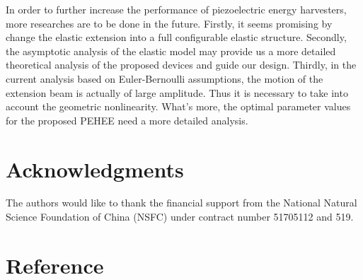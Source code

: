 \documentclass{elsarticle}
\begin{document}
In order to further increase the performance of piezoelectric energy harvesters, more researches are to be done in the future. Firstly, it seems promising by change the elastic extension into a full configurable elastic structure. Secondly, the asymptotic analysis of the elastic model may provide us a more detailed theoretical analysis of the proposed devices and guide our design. Thirdly, in the current analysis based on Euler-Bernoulli assumptions, the motion of the extension beam is actually of large amplitude. Thus it is necessary to take into account the geometric nonlinearity. What's more, the optimal parameter values for the proposed PEHEE need a more detailed analysis.

\section*{Acknowledgments}
The authors would like to thank the financial support from the National Natural Science Foundation of China (NSFC) under contract number 51705112 and 519.


\section*{Reference}



\end{document}
